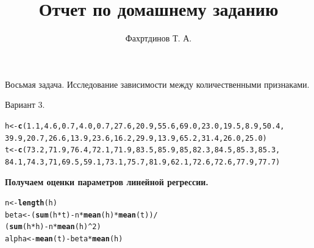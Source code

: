 \documentclass{article}\usepackage[]{graphicx}\usepackage[]{color}
\makeatletter
\newcommand{\hlnum}[1]{\textcolor[rgb]{0.686,0.059,0.569}{#1}}%
\newcommand{\hlopt}[1]{\textcolor[rgb]{0,0,0}{#1}}%
\newcommand{\hlstd}[1]{\textcolor[rgb]{0.345,0.345,0.345}{#1}}%
\newcommand{\hlkwb}[1]{\textcolor[rgb]{0.69,0.353,0.396}{#1}}%
\newcommand{\hlkwd}[1]{\textcolor[rgb]{0.737,0.353,0.396}{\textbf{#1}}}%
\newenvironment{kframe}{%
 \def\at@end@of@kframe{}%
 \ifinner\ifhmode%
  \def\at@end@of@kframe{\end{minipage}}%
  \begin{minipage}{\columnwidth}%
 \fi\fi%
 \def\FrameCommand##1{\hskip\@totalleftmargin \hskip-\fboxsep
 \colorbox{shadecolor}{##1}\hskip-\fboxsep
     \hskip-\linewidth \hskip-\@totalleftmargin \hskip\columnwidth}%
 \MakeFramed {\advance\hsize-\width
   \@totalleftmargin\z@ \linewidth\hsize
   \@setminipage}}%
 {\par\unskip\endMakeFramed%
 \at@end@of@kframe}
\newenvironment{knitrout}{}{} %
\makeatother
\begin{document}
\title{Отчет по домашнему заданию}
\pretitle{\vspace{\droptitle}\centering\huge}
\posttitle{\par}
\author{Фахртдинов Т. А.}


\maketitle
Восьмая задача. 
Исследование зависимости между количественными признаками.

Вариант 3.
\begin{knitrout}
\color{fgcolor}\begin{kframe}
\begin{alltt}
\hlstd{h} \hlkwb{<-} \hlkwd{c}\hlstd{(}\hlnum{1.1}\hlstd{,} \hlnum{4.6}\hlstd{,} \hlnum{0.7}\hlstd{,} \hlnum{4.0}\hlstd{,} \hlnum{0.7}\hlstd{,} \hlnum{27.6}\hlstd{,} \hlnum{20.9}\hlstd{,} \hlnum{55.6}\hlstd{,} \hlnum{69.0}\hlstd{,} \hlnum{23.0}\hlstd{,} \hlnum{19.5}\hlstd{,} \hlnum{8.9}\hlstd{,} \hlnum{50.4}\hlstd{,}
       \hlnum{39.9}\hlstd{,} \hlnum{20.7}\hlstd{,} \hlnum{26.6}\hlstd{,} \hlnum{13.9}\hlstd{,} \hlnum{23.6}\hlstd{,} \hlnum{16.2}\hlstd{,} \hlnum{29.9}\hlstd{,} \hlnum{13.9}\hlstd{,} \hlnum{65.2}\hlstd{,} \hlnum{31.4}\hlstd{,} \hlnum{26.0}\hlstd{,} \hlnum{25.0}\hlstd{)}
\hlstd{t} \hlkwb{<-} \hlkwd{c}\hlstd{(}\hlnum{73.2}\hlstd{,} \hlnum{71.9}\hlstd{,} \hlnum{76.4}\hlstd{,} \hlnum{72.1}\hlstd{,} \hlnum{71.9}\hlstd{,} \hlnum{83.5}\hlstd{,} \hlnum{85.9}\hlstd{,} \hlnum{85}\hlstd{,} \hlnum{82.3}\hlstd{,} \hlnum{84.5}\hlstd{,} \hlnum{85.3}\hlstd{,} \hlnum{85.3}\hlstd{,}
       \hlnum{84.1}\hlstd{,} \hlnum{74.3}\hlstd{,} \hlnum{71}\hlstd{,} \hlnum{69.5}\hlstd{,} \hlnum{59.1}\hlstd{,} \hlnum{73.1}\hlstd{,} \hlnum{75.7}\hlstd{,} \hlnum{81.9}\hlstd{,} \hlnum{62.1}\hlstd{,} \hlnum{72.6}\hlstd{,} \hlnum{72.6}\hlstd{,} \hlnum{77.9}\hlstd{,} \hlnum{77.7}\hlstd{)}
\end{alltt}
\end{kframe}
\end{knitrout}
\textbf{Получаем оценки параметров линейной регрессии.}
\begin{knitrout}
\color{fgcolor}\begin{kframe}
\begin{alltt}
\hlstd{n} \hlkwb{<-} \hlkwd{length}\hlstd{(h)}
\hlstd{beta} \hlkwb{<-} \hlstd{(}\hlkwd{sum}\hlstd{(h} \hlopt{*} \hlstd{t)} \hlopt{-} \hlstd{n} \hlopt{*} \hlkwd{mean}\hlstd{(h)} \hlopt{*} \hlkwd{mean}\hlstd{(t))} \hlopt{/}
        \hlstd{(}\hlkwd{sum}\hlstd{(h} \hlopt{*} \hlstd{h)} \hlopt{-} \hlstd{n} \hlopt{*} \hlkwd{mean}\hlstd{(h)}\hlopt{^}\hlnum{2}\hlstd{)}
\hlstd{alpha} \hlkwb{<-} \hlkwd{mean}\hlstd{(t)} \hlopt{-} \hlstd{beta} \hlopt{*} \hlkwd{mean}\hlstd{(h)}
\end{alltt}
\end{kframe}
\end{knitrout}
\end{document}

